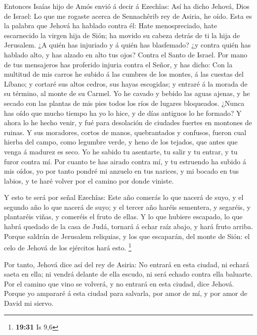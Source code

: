  Entonces Isaías hijo de Amós envió á decir á Ezechîas:
Así ha dicho Jehová, Dios de Israel: Lo que me rogaste acerca de
Sennachêrib rey de Asiria, he oído.  Esta es la palabra
que Jehová ha hablado contra él: Hate menospreciado, hate escarnecido la
virgen hija de Sión; ha movido su cabeza detrás de ti la hija de
Jerusalem.  ¿A quién has injuriado y á quién has
blasfemado? ¿y contra quién has hablado alto, y has alzado en alto tus
ojos? Contra el Santo de Israel.  Por mano de tus
mensajeros has proferido injuria contra el Señor, y has dicho: Con la
multitud de mis carros he subido á las cumbres de los montes, á las
cuestas del Líbano; y cortaré sus altos cedros, sus hayas escogidas; y
entraré á la morada de su término, al monte de su Carmel.
 Yo he cavado y bebido las aguas ajenas, y he secado con
las plantas de mis pies todos los ríos de lugares bloqueados.
 ¿Nunca has oído que mucho tiempo ha yo lo hice, y de
días antiguos lo he formado? Y ahora lo he hecho venir, y fué para
desolación de ciudades fuertes en montones de ruinas.  Y
sus moradores, cortos de manos, quebrantados y confusos, fueron cual
hierba del campo, como legumbre verde, y heno de los tejados, que antes
que venga á madurez es seco.  Yo he sabido tu asentarte,
tu salir y tu entrar, y tu furor contra mí.  Por cuanto
te has airado contra mí, y tu estruendo ha subido á mis oídos, yo por
tanto pondré mi anzuelo en tus narices, y mi bocado en tus labios, y te
haré volver por el camino por donde viniste.

 Y esto te será por señal Ezechîas: Este año comerás lo
que nacerá de suyo, y el segundo año lo que nacerá de suyo; y el tercer
año haréis sementera, y segaréis, y plantaréis viñas, y comeréis el
fruto de ellas.  Y lo que hubiere escapado, lo que habrá
quedado de la casa de Judá, tornará á echar raíz abajo, y hará fruto
arriba.  Porque saldrán de Jerusalem reliquias, y los que
escaparán, del monte de Sión: el celo de Jehová de los ejércitos hará
esto. \footnote{\textbf{19:31} Is 9,6}

 Por tanto, Jehová dice así del rey de Asiria: No entrará
en esta ciudad, ni echará saeta en ella; ni vendrá delante de ella
escudo, ni será echado contra ella baluarte.  Por el
camino que vino se volverá, y no entrará en esta ciudad, dice Jehová.
 Porque yo ampararé á esta ciudad para salvarla, por amor
de mí, y por amor de David mi siervo.

